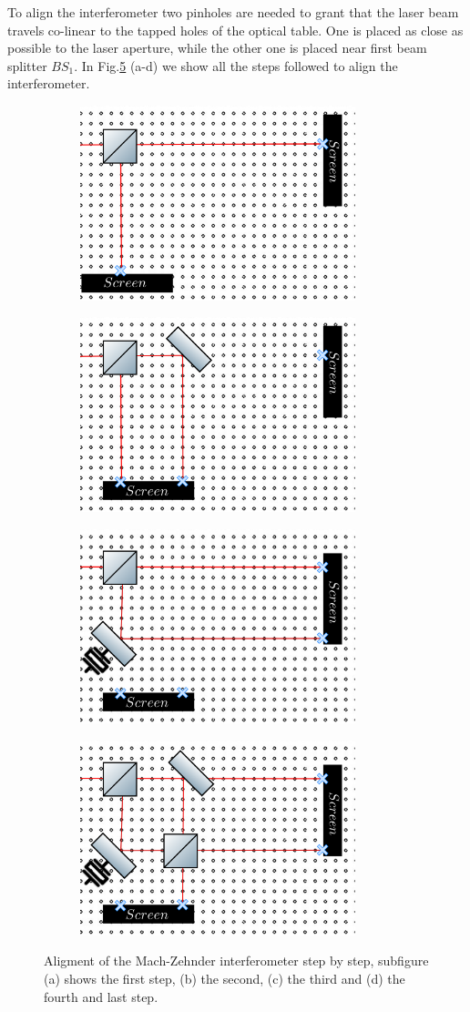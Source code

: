 \documentclass[12pt]{book}
\begin{document}
To align the interferometer two pinholes are needed to grant that the laser beam travels co-linear to the tapped holes of the optical table. One is placed as close as possible to the laser aperture, while the other one is placed near first beam splitter $BS_{1}$. In Fig.\ref{steps} (a-d) we show all the steps followed to align the interferometer.

\begin{figure}[t!]
\centering
\begin{subfigure}[b]{0.55\linewidth}
\includegraphics[width=8cm,height=4 cm]{images/first_step.png}
\caption{}
\label{fig:BS1}
\end{subfigure}
\begin{subfigure}[b]{0.55\linewidth}
\includegraphics[width=8cm,height=4 cm]{images/second_step.png}
\caption{}
\label{fig:BS1}
\end{subfigure}
\begin{subfigure}[b]{0.55\linewidth}
\includegraphics[width=8cm,height=4 cm]{images/third_step.png}
\caption{}
\label{fig:BS1}
\end{subfigure}
\begin{subfigure}[b]{0.55\linewidth}
\includegraphics[width=8cm,height=4 cm]{images/last_step.png}
\caption{}
\label{fig:westminster_aerea}
\end{subfigure}
\caption{Aligment of the Mach-Zehnder interferometer step by step, subfigure (a) shows the first step, (b) the second, (c) the third and (d) the fourth and last step.}
\label{steps}
\end{figure}
\end{document}

